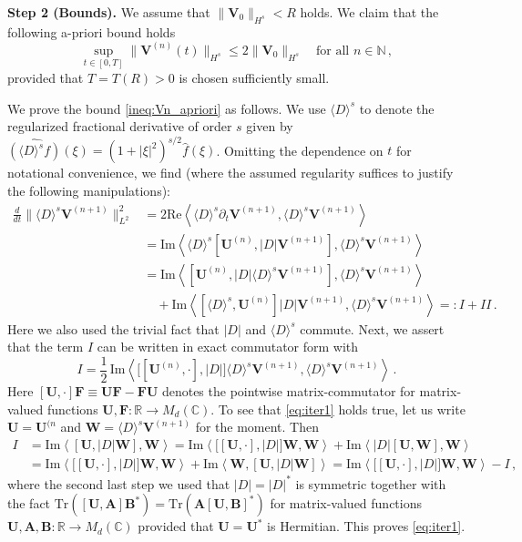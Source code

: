 \documentclass[11pt,reqno]{amsart}
\theoremstyle{definition}
\theoremstyle{remark}
\theoremstyle{remark}
\numberwithin{equation}{section}
\newcommand{\C}{\mathbb{C}}
\newcommand{\N}{\mathbb{N}}
\newcommand{\R}{\mathbb{R}}
\newcommand{\pt}{\partial}
\newcommand{\be}{\begin{equation}}
\newcommand{\ee}{\end{equation}}
\newcommand{\Vb}{\mathbf{V}}
\newcommand{\Wb}{\mathbf{W}}
\newcommand{\Ub}{\mathbf{U}}
\newcommand{\Tr}{\mathrm{Tr}}
\newcommand{\Dsr}{\langle D \rangle}
\begin{document}
\begin{appendix}
\medskip
\textbf{Step 2 (Bounds).} We assume that $\| \Vb_0 \|_{H^s} < R$ holds. We claim that the following a-priori bound holds
\be \label{ineq:Vn_apriori}
\sup_{t \in [0,T]} \| \Vb^{(n)}(t) \|_{H^s} \leq 2 \| \Vb_0 \|_{H^s} \quad \mbox{for all $n \in \N$}\, ,
\ee
 provided that $T=T(R) > 0$ is chosen sufficiently small. 

We prove the bound \eqref{ineq:Vn_apriori} as follows. We use $\Dsr^s$ to denote the regularized fractional derivative of order $s$ given by $\widehat{(\Dsr^s f)}(\xi) = (1+|\xi|^2)^{s/2} \widehat{f}(\xi)$. Omitting the dependence on $t$ for notational convenience, we find (where the assumed regularity suffices to justify the following manipulations):
\begin{align*}
\frac{d}{dt} \big \| \Dsr^s \Vb^{(n+1)} \big  \|_{L^2}^2 & = 2 \mathrm{Re} \left \langle \Dsr^s \pt_t \Vb^{(n+1)}, \Dsr^s \Vb^{(n+1)} \right \rangle \\
& = \mathrm{Im} \left \langle \Dsr^s [\Ub^{(n)}, |D| \Vb^{(n+1)}], \Dsr^s \Vb^{(n+1)} \right \rangle \\
& = \mathrm{Im} \left \langle [\Ub^{(n)},  |D| \Dsr^s \Vb^{(n+1)}], \Dsr^s \Vb^{(n+1)} \right \rangle \\
& \quad + \mathrm{Im} \left \langle [\Dsr^s, \Ub^{(n)}] |D| \Vb^{(n+1)}, \Dsr^s \Vb^{(n+1)} \right \rangle  =: I + II \, .
\end{align*}
Here we also used the trivial fact that $|D|$ and $\Dsr^s$ commute. Next, we assert that the term $I$ can be written in exact commutator form with
\be \label{eq:iter1}
I = \frac{1}{2} \, \mathrm{Im} \left \langle \big [ [\Ub^{(n)}, \cdot], |D|] \Dsr^s \Vb^{(n+1)}, \Dsr^s \Vb^{(n+1)} \right \rangle \, .
\ee
Here $[\Ub, \cdot] \mathbf{F} \equiv \Ub \mathbf{F} - \mathbf{F} \Ub$ denotes the pointwise matrix-commutator for matrix-valued functions $\Ub, \mathbf{F} : \R \to M_d(\C)$.  To see that \eqref{eq:iter1} holds true, let us write $\Ub = \Ub^{(n}$ and $\Wb = \Dsr^s \Vb^{(n+1)}$ for the moment. Then
\begin{align*}
I & = \mathrm{Im} \left \langle [\Ub, |D| \Wb], \Wb \right \rangle = \mathrm{Im} \left \langle \big [ [\Ub, \cdot], |D|] \Wb, \Wb \right \rangle + \mathrm{Im} \left \langle |D| [\Ub, \Wb], \Wb \right \rangle \\
& = \mathrm{Im} \left \langle \big [ [\Ub, \cdot], |D|] \Wb, \Wb \right \rangle + \mathrm{Im} \left \langle  \Wb, [\Ub, |D| \Wb] \right \rangle = \mathrm{Im} \left \langle \big [ [\Ub, \cdot], |D|] \Wb, \Wb \right \rangle - I \, ,
\end{align*}
where the second last step we used that $|D| = |D|^*$ is symmetric together with the fact $\Tr([\Ub, \mathbf{A}] \mathbf{B}^*) = \Tr(\mathbf{A} [\Ub, \mathbf{B}]^*)$ for matrix-valued functions $\Ub, \mathbf{A}, \mathbf{B} : \R \to M_d(\C)$ provided that $\Ub= \Ub^*$ is Hermitian. This proves \eqref{eq:iter1}. 


\end{appendix}
\end{document}
